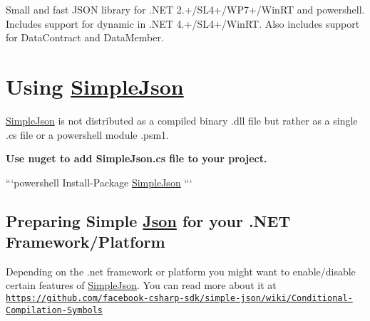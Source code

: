 Small and fast J\-S\-O\-N library for .N\-E\-T 2.+/\-S\-L4+/\-W\-P7+/\-Win\-R\-T and powershell. Includes support for dynamic in .N\-E\-T 4.+/\-S\-L4+/\-Win\-R\-T. Also includes support for Data\-Contract and Data\-Member.

\section*{Using \hyperlink{namespace_simple_json}{Simple\-Json}}

\hyperlink{namespace_simple_json}{Simple\-Json} is not distributed as a compiled binary .dll file but rather as a single .cs file or a powershell module .psm1.

{\bfseries Use nuget to add Simple\-Json.\-cs file to your project.}

```powershell Install-\/\-Package \hyperlink{namespace_simple_json}{Simple\-Json} ```

\subsection*{Preparing Simple \hyperlink{namespace_json}{Json} for your .N\-E\-T Framework/\-Platform}

Depending on the .net framework or platform you might want to enable/disable certain features of \hyperlink{namespace_simple_json}{Simple\-Json}. You can read more about it at \href{https://github.com/facebook-csharp-sdk/simple-json/wiki/Conditional-Compilation-Symbols}{\tt https\-://github.\-com/facebook-\/csharp-\/sdk/simple-\/json/wiki/\-Conditional-\/\-Compilation-\/\-Symbols} 